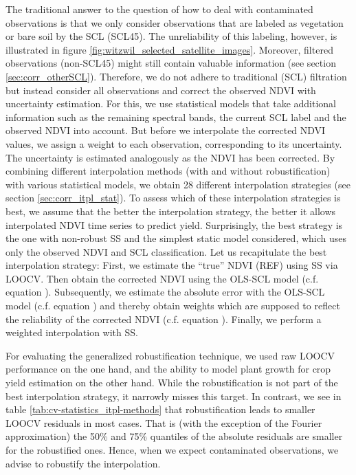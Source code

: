 The traditional answer to the question of how to deal with contaminated observations is that we only consider observations that are labeled as vegetation or bare soil by the SCL (SCL45). The unreliability of this labeling, however, is illustrated in figure \ref{fig:witzwil_selected_satellite_images}. Moreover, filtered observations (non-SCL45) might still contain valuable information (see section \ref{sec:corr_otherSCL}). Therefore, we do not adhere to traditional (SCL) filtration but instead consider all observations and correct the observed NDVI with uncertainty estimation. For this, we use statistical models that take additional information such as the remaining spectral bands, the current SCL label and the observed NDVI into account. But before we interpolate the corrected NDVI values, we assign a weight to each observation, corresponding to its uncertainty. The uncertainty is estimated analogously as the NDVI has been corrected. 
    By combining different interpolation methods (with and without robustification) with various statistical models, we obtain 28 different interpolation strategies (see section \ref{sec:corr_itpl_stat}). To assess which of these interpolation strategies is best, we assume that the better the interpolation strategy, the better it allows interpolated NDVI time series to predict yield. Surprisingly, the best strategy is the one with non-robust SS and the simplest static model considered, which uses only the observed NDVI and SCL classification.
Let us recapitulate the best interpolation strategy: First, we estimate the ``true'' NDVI (REF) using SS via LOOCV. Then obtain the corrected NDVI using the OLS-SCL model (c.f. equation ). Subsequently, we estimate the absolute error with the OLS-SCL model (c.f. equation ) and thereby obtain weights which are supposed to reflect the reliability of the corrected NDVI (c.f. equation ). Finally, we perform a weighted interpolation with SS.

For evaluating the generalized robustification technique, we used raw LOOCV performance on the one hand, and the ability to model plant growth for crop yield estimation on the other hand.
While the robustification is not part of the best interpolation strategy, it narrowly misses this target. In contrast, we see in table \ref{tab:cv-statistics_itpl-methods} that robustification leads to smaller LOOCV residuals in most cases. That is (with the exception of the Fourier approximation) the 50\% and 75\% quantiles of the absolute residuals are smaller for the robustified ones. Hence, when we expect contaminated observations, we advise to robustify the interpolation. 

